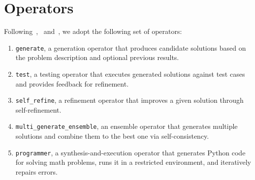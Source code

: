 \documentclass{article}
\theoremstyle{plain}
\theoremstyle{definition}
\theoremstyle{remark}
\begin{document}
\section{Operators}
\label{app:Operators}
Following~\citet{zhang_aflow_2025},~\citet{zhang_multi-agent_2025} and~\citet{zheng_mermaidflow_2025}, we adopt the following set of operators:
\begin{enumerate}
    \item \texttt{generate}, 
    a generation operator that produces candidate solutions based on the problem description and optional previous results.

    \item \texttt{test}, 
    a testing operator that executes generated solutions against test cases and provides feedback for refinement.

    \item \texttt{self\_refine}, 
    a refinement operator that improves a given solution through self-refinement.

    \item \texttt{multi\_generate\_ensemble}, 
    an ensemble operator that generates multiple solutions and combine them to the best one via self-consistency.

    \item \texttt{programmer}, 
    a synthesis-and-execution operator that generates Python code for solving math problems, runs it in a restricted environment, and iteratively repairs errors.
\end{enumerate}
\end{document}
